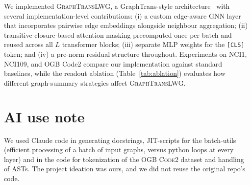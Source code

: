 \documentclass[11pt]{article}
\begin{document}
We implemented \textsc{GraphTransLWG}, a GraphTrans-style architecture~\cite{wu2022representinglongrangecontextgraph} with several implementation-level contributions: (i) a custom edge-aware GNN layer that incorporates pairwise edge embeddings alongside neighbour aggregation; (ii) transitive-closure-based attention masking precomputed once per batch and reused across all $L$ transformer blocks; (iii) separate MLP weights for the \texttt{[CLS]} token; and (iv) a pre-norm residual structure throughout. Experiments on \textsf{NCI1}, \textsf{NCI109}, and \textsf{OGB Code2} compare our implementation against standard baselines, while the readout ablation (Table~\ref{tab:ablation}) evaluates how different graph-summary strategies affect \textsc{GraphTransLWG}.

\section*{AI use note}
We used Claude code in generating docstrings, JIT-scripts for the batch-utils (efficient processing of a batch of input graphs, versus python loops at every layer) and in the code for tokenization of the \textsc{OGB Code2} dataset and handling of ASTs. The project ideation was ours, and we did not reuse the original repo's code.

\newpage


\end{document}
